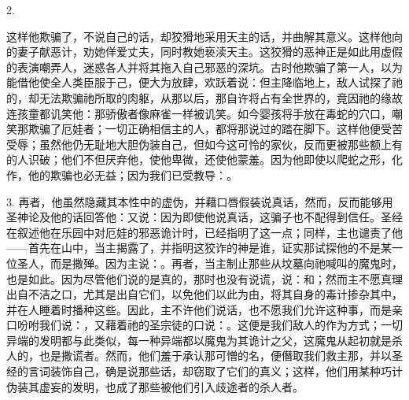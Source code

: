 2. \par

这样他欺骗了，不说自己的话，却狡猾地采用天主的话，并曲解其意义。这样他向的妻子献恶计，劝她佯爱丈夫，同时教她亵渎天主。这狡猾的恶神正是如此用虚假的表演嘲弄人，迷惑各人并将其拖入自己邪恶的深坑。古时他欺骗了第一人，以为能借他使全人类臣服于己，便大为放肆，欢跃着说：但主降临地上，敌人试探了祂的，却无法欺骗祂所取的肉躯，从那以后，那自许将占有全世界的，竟因祂的缘故连孩童都讥笑他：那骄傲者像麻雀一样被讥笑。如今婴孩将手放在毒蛇的穴口，嘲笑那欺骗了厄娃者；一切正确相信主的人，都将那说过的踏在脚下。这样他便受苦受辱；虽然他仍无耻地大胆伪装自己，但如今这可怜的家伙，反而更被那些额上有的人识破；他们不但厌弃他，使他卑微，还使他蒙羞。因为他即使以爬蛇之形，化作，他的欺骗也必无益；因为我们已受教导：。\par

3. 再者，他虽然隐藏其本性中的虚伪，并藉口唇假装说真话，然而，反而能够用圣神论及他的话回答他：又说：因为即使他说真话，这骗子也不配得到信任。圣经在叙述他在乐园中对厄娃的邪恶诡计时，已经指明了这一点；同样，主也谴责了他——首先在山中，当主揭露了，并指明这狡诈的神是谁，证实那试探他的不是某一位圣人，而是撒殚。因为主说：。再者，当主制止那些从坟墓向祂喊叫的魔鬼时，也是如此。因为尽管他们说的是真的，那时也没有说谎，说：和；然而主不愿真理出自不洁之口，尤其是出自它们，以免他们以此为由，将其自身的毒计掺杂其中，并在人睡着时播种这些。因此，主不许他们说话，也不愿我们允许这种事，而是亲口吩咐我们说：，又藉着祂的圣宗徒的口说：。这便是我们敌人的作为方式；一切异端的发明都与此类似，每一种异端都以魔鬼为其诡计之父，这魔鬼从起初就是杀人的，也是撒谎者。然而，他们羞于承认那可憎的名，便僭取我们救主那，并以圣经的言词装饰自己，确是说那些话，却窃取了它们的真义；这样，他们用某种巧计伪装其虚妄的发明，也成了那些被他们引入歧途者的杀人者。\par


